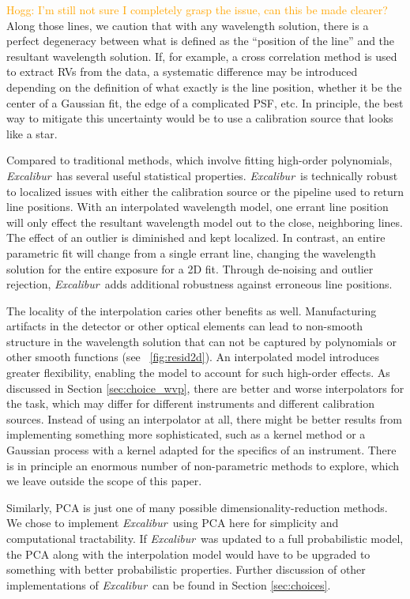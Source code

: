 \documentclass[modern]{aastex63}
\newcommand{\project}[1]{\textsl{#1}}
\newcommand{\name}{\project{Excalibur}}
\newcommand{\lz}[1]{\textcolor{orange}{#1}}
\begin{document}
\lz{Hogg: I'm still not sure I completely grasp the issue, can this be made clearer?}
Along those lines, we caution that with any wavelength solution, there is a perfect degeneracy between what is defined as the ``position of the line'' and the resultant wavelength solution.  If, for example, a cross correlation method is used to extract RVs from the data, a systematic difference may be introduced depending on the definition of what exactly is the line position, whether it be the center of a Gaussian fit, the edge of a complicated PSF, etc.  In principle, the best way to mitigate this uncertainty would be to use a calibration source that looks like a star.

Compared to traditional methods, which involve fitting high-order polynomials, \name\ has several useful statistical properties.  \name\ is technically robust to localized issues with either the calibration source or the pipeline used to return line positions.  With an interpolated wavelength model, one errant line position will only effect the resultant wavelength model out to the close, neighboring lines.  The effect of an outlier is diminished and kept localized.  In contrast, an entire parametric fit will change from a single errant line, changing the wavelength solution for the entire exposure for a 2D fit.  Through de-noising and outlier rejection, \name\ adds additional robustness against erroneous line positions.

The locality of the interpolation caries other benefits as well.  Manufacturing artifacts in the detector or other optical elements can lead to non-smooth structure in the wavelength solution that can not be captured by polynomials or other smooth functions (see \figurename~\ref{fig:resid2d}).  An interpolated model introduces greater flexibility, enabling the model to account for such high-order effects.  As discussed in Section \ref{sec:choice_wvp}, there are better and worse interpolators for the task, which may differ for different instruments and different calibration sources.  Instead of using an interpolator at all, there might be better results from implementing something more sophisticated, such as a kernel method or a Gaussian process with a kernel adapted for the specifics of an instrument.  There is in principle an enormous number of non-parametric methods to explore, which we leave outside the scope of this paper.

Similarly, PCA is just one of many possible dimensionality-reduction methods.  We chose to implement \name\ using PCA here for simplicity and computational tractability.  If \name\ was updated to a full probabilistic model, the PCA along with the interpolation model would have to be upgraded to something with better probabilistic properties.  Further discussion of other implementations of \name\ can be found in Section \ref{sec:choices}.
\end{document}
